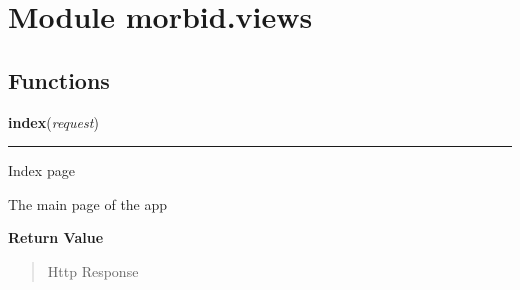 %
%
%


\section{Module morbid.views}

    \label{morbid:views}


  \subsection{Functions}

    \label{morbid:views:index}

    \vspace{0.5ex}

\hspace{.8\funcindent}\begin{boxedminipage}{\funcwidth}

    \raggedright \textbf{index}(\textit{request})

    \vspace{-1.5ex}

    \rule{\textwidth}{0.5\fboxrule}
\setlength{\parskip}{2ex}
    Index page

    The main page of the app

\setlength{\parskip}{1ex}
      \textbf{Return Value}
    \vspace{-1ex}

      \begin{quote}
      Http Response

      \end{quote}

    \end{boxedminipage}

